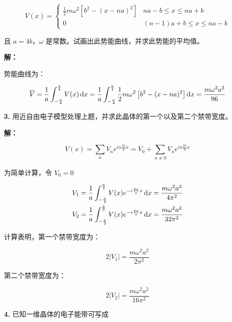 \begin{equation*}
    V(x) =
    \begin{cases}
        \frac{1}{2} m \omega^2 \left[b^2-(x-na)^2\right] & na-b \le x \le na+b \\
        0 & (n-1)a+b \le x \le na-b
    \end{cases}
\end{equation*}

且 $a=4b$，$\omega$ 是常数。试画出此势能曲线，并求此势能的平均值。

\noindent \textbf{解：}

势能曲线为：

\begin{equation*}
    \overline{V} = \frac{1}{a} \int_{-\frac{a}{4}}^{\frac{a}{4}} V(x) \mathop{}\!\mathrm{d} x = \frac{1}{a} \int_{-\frac{a}{4}}^{\frac{a}{4}} \frac{1}{2} m \omega^2 \left[b^2 - (x-na)^2\right] \mathop{}\!\mathrm{d} x = \frac{m \omega^2 a^2}{96}
\end{equation*}

\noindent \textbf{3.\quad} 用近自由电子模型处理上题，并求此晶体的第一个以及第二个禁带宽度。

\noindent \textbf{解：}

\begin{equation*}
    V(x) = \sum_n V_n e^{in \frac{2\pi}{a} x} = V_0 + \sum_{n \ne 0} V_n e^{in \frac{2\pi}{a} x}
\end{equation*}

为简单计算，令 $V_0=0$

\begin{align*}
    V_1 = \frac{1}{a} \int_{-\frac{a}{2}}^{\frac{a}{2}} V(x) e^{-i \frac{2\pi}{a} x} \mathop{}\!\mathrm{d} x = \frac{m \omega^2 a^2}{4 \pi^2} \\
    V_2 = \frac{1}{a} \int_{-\frac{a}{2}}^{\frac{a}{2}} V(x) e^{-i \frac{4\pi}{a} x} \mathop{}\!\mathrm{d} x = \frac{m \omega^2 a^2}{32 \pi^2}
\end{align*}

计算表明，第一个禁带宽度为：

\begin{equation*}
    2|V_1| = \frac{m \omega^2 a^2}{2\pi^2}
\end{equation*}

第二个禁带宽度为：

\begin{equation*}
    2|V_2| = \frac{m \omega^2 a^2}{16\pi^2}
\end{equation*}

\noindent \textbf{4.\quad} 已知一维晶体的电子能带可写成

